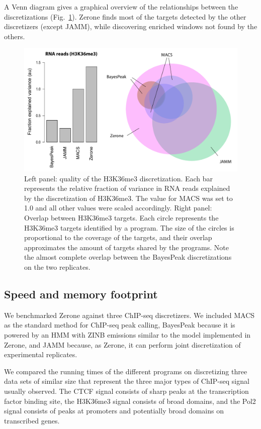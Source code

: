 \documentclass{bioinfo}
\begin{document}
A Venn diagram gives a graphical overview of the relationships
between the discretizations (Fig.~\ref{fig:venn}). Zerone finds
most of the targets detected by the other discretizers (except JAMM),
while discovering enriched windows not found by the others.

\begin{figure}[!tpb]
\centerline{\includegraphics[scale=0.4]{histone_venn_color_names.pdf}}
\caption{
  Left panel: quality of the H3K36me3 discretization. Each bar
  represents the relative fraction of variance in RNA reads
  explained by the discretization of H3K36me3. The value for MACS was
  set to 1.0 and all other values were scaled accordingly. Right
  panel: Overlap between H3K36me3 targets. Each circle represents the
  H3K36me3 targets identified by a program. The size of the circles
  is proportional to the coverage of the targets, and their overlap
  approximates the amount of targets shared by the programs. Note
  the almost complete overlap between the BayesPeak discretizations
  on the two replicates.
}\label{fig:venn}
\end{figure}

\subsection{Speed and memory footprint}
We benchmarked Zerone against three ChIP-seq discretizers.
We included MACS as the standard method for ChIP-seq peak calling,
BayesPeak because it is powered by an HMM with ZINB emissions
similar to the model implemented in Zerone, and JAMM because, as
Zerone, it can perform joint discretization of experimental replicates.

We compared the running times of the different programs on discretizing
three data sets of similar size that represent the three major types of
ChIP-seq signal usually observed. The CTCF signal consists of sharp
peaks at the transcription factor binding site, the H3K36me3 signal
consists of broad domains, and the Pol2 signal consists of  peaks
at promoters and potentially broad domains on transcribed genes.
\end{document}
